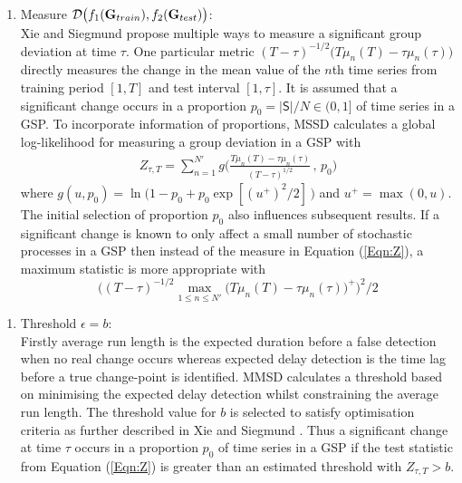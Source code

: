\begin{enumerate}[3.] 
\item Measure $ \mathcal{D}\big(f_1 ({\bf G}_{train}) , f_2({\bf G}_{test} )\big )$: \\
Xie and Siegmund  \cite{xie2013} propose multiple ways to measure a significant group deviation at time $\tau$. %
One particular metric $ (T-\tau)^{-1/2}  \big( T \mu_n(T) - \tau \mu_n(\tau) \big) $ directly measures the change in the mean value of the $n$th time series from training period $[1,T]$ and test interval $[1,\tau]$. 
It is assumed that a significant change occurs in a proportion $p_0 = |\mathsf{S}|/N \in (0,1]$ of time series in a GSP.   
 To incorporate information of proportions, MSSD calculates a global log-likelihood for measuring a group deviation in a GSP  with
\begin{align}
  Z_{\tau,T}=\sum_{n=1}^{N'} g\Big( \frac{   T \mu_n(T) - \tau \mu_n(\tau)  } {(T-\tau)^{1/2}}
 \, , \, p_0  \Big) \label{Eqn:Z} %
\end{align}
where  
$ g(u,p_0)= \ln \big(1-p_0+p_0 \exp[(u^+)^2/2] \,\big)$ and $u^+=\max(0,u)$. The initial selection of proportion $p_0$ also influences subsequent results.
If a significant change is known to only affect a small number of stochastic processes in a GSP then  instead of the measure in Equation (\ref{Eqn:Z}), a maximum statistic is more appropriate with 
\[ \Big( (T-\tau)^{-1/2}  \max_{1 \le n \le N'} 
\big( T \mu_n(T) - \tau \mu_n(\tau) \big)^+ \Big)^2/2  
\]
\end{enumerate}
\begin{enumerate}[4.]
\item Threshold $\epsilon = b $: \\ 
Firstly average run length is  the expected duration before a false detection when no real change occurs whereas expected delay detection is the time lag  before a true change-point is identified. 
MMSD calculates a threshold based on minimising the expected delay detection whilst constraining the average run length.  The threshold value for $b$ is selected  to satisfy optimisation criteria as further  described in Xie and Siegmund  \cite{xie2013}. Thus a significant change at time $\tau $ occurs in a proportion $p_0$ of time series in a GSP  if the test statistic from Equation (\ref{Eqn:Z}) is greater than an estimated threshold with $Z_{\tau,T}>b$. 
\end{enumerate}
 
 